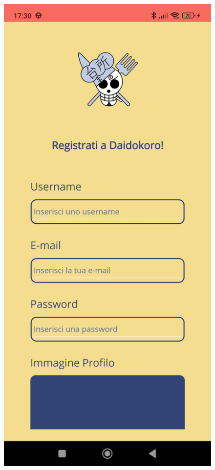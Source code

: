 ﻿\documentclass[a4paper,12pt]{report}
\begin{document}
\begin{figure}[h!]
    \begin{minipage}{.5\textwidth}
        \centering
        \includegraphics[width=0.9\linewidth]{app_images/Register.jpg}
    \end{minipage}
\end{figure}
\end{document}
